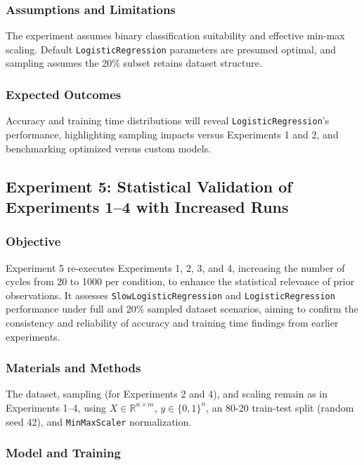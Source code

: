 \documentclass{article}
\theoremstyle{plain}
\theoremstyle{definition}
\theoremstyle{remark}
\begin{document}
\subsubsection{Assumptions and Limitations}

The experiment assumes binary classification suitability and effective min-max scaling. Default \texttt{LogisticRegression} parameters are presumed optimal, and sampling assumes the 20\% subset retains dataset structure.

\subsubsection{Expected Outcomes}

Accuracy and training time distributions will reveal \texttt{LogisticRegression}'s performance, highlighting sampling impacts versus Experiments 1 and 2, and benchmarking optimized versus custom models.


\subsection{Experiment 5: Statistical Validation of Experiments 1–4 with Increased Runs}

\subsubsection{Objective}

Experiment 5 re-executes Experiments 1, 2, 3, and 4, increasing the number of cycles from 20 to 1000 per condition, to enhance the statistical relevance of prior observations. It assesses \texttt{SlowLogisticRegression} and \texttt{LogisticRegression} performance under full and 20\% sampled dataset scenarios, aiming to confirm the consistency and reliability of accuracy and training time findings from earlier experiments.

\subsubsection{Materials and Methods}

The dataset, sampling (for Experiments 2 and 4), and scaling remain as in Experiments 1–4, using $ X \in \mathbb{R}^{n \times m} $, $ y \in \{0, 1\}^n $, an 80-20 train-test split (random seed 42), and \texttt{MinMaxScaler} normalization.

\subsubsection{Model and Training}
\end{document}
